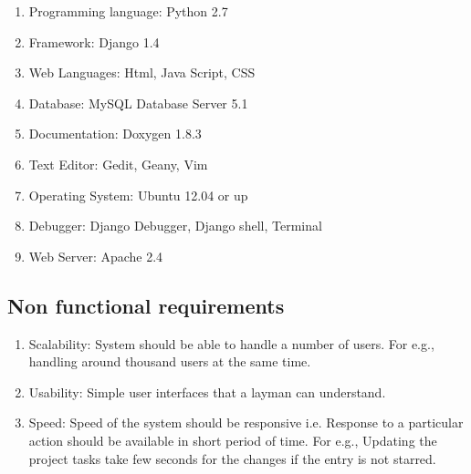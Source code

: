 \begin{itemize}
\begin{enumerate}
\item Programming language: Python 2.7
\item Framework: Django 1.4 
\item Web Languages: Html, Java Script, CSS 
\item Database: MySQL Database Server 5.1 
\item Documentation: Doxygen 1.8.3
\item Text Editor: Gedit, Geany, Vim
\item Operating System: Ubuntu 12.04 or up
\item Debugger: Django Debugger, Django shell, Terminal
\item Web Server: Apache 2.4
\end{enumerate}
\vskip 0.5cm
\subsection{Non functional requirements}
\begin{enumerate} 
\item Scalability: System should be able to handle a number of users. 
For e.g., handling around thousand users at the same time.
\item Usability: Simple user interfaces that a layman can understand.
\item Speed: Speed of the system should be responsive i.e. Response to
 a particular action should be available in short period of time. For 
e.g., Updating the project tasks take few seconds for the changes if 
the entry is not starred.
\end{enumerate}
\end{itemize}
